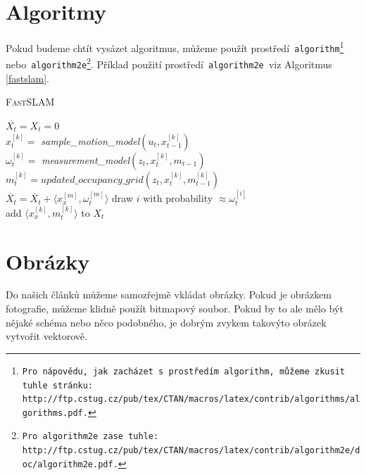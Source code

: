 \documentclass[a4paper,11pt,titlepage]{article}
\begin{document}
\section{Algoritmy} \label{algorithms}
Pokud budeme chtít vysázet algoritmus, můžeme použít prostředí\texttt{ algorithm\footnote{Pro nápovědu, jak zacházet s prostředím\texttt{ algorithm,} můžeme zkusit tuhle 
stránku:\\http://ftp.cstug.cz/pub/tex/CTAN/macros/latex/contrib/algorithms/algorithms.pdf.} } 
nebo\texttt{ algorithm2e\footnote{Pro\texttt{ algorithm2e }zase tuhle: http://ftp.cstug.cz/pub/tex/CTAN/macros/latex/contrib/algorithm2e/doc/algorithm2e.pdf.}}.
Příklad použití prostředí\texttt{ algorithm2e }viz Algoritmus \ref{fastslam}.\\

\bigskip


\begin{algorithm}[H]
\caption{\textsc{FastSLAM}}
\label{fastslam}
\SetNlSty{}{}{:}
\SetInd{1em}{1em}
\SetNlSkip{-1.33em}

\BlankLine
\Indp\Indp
    \ShowLn$\overline{X_t} = X_t = 0$\\
    { 
        $x_t^{[k]} =$ \emph{sample\_motion\_model}$(u_t,x_{t-1}^{[k]})$\\
        $\omega_t^{[k]} =$ \emph{measurement\_model}$(z_t,x_t^{[k]},m_{t-1})$\\
        $m_t^{[k]} = updated\_occupancy\_grid(z_t,x_t^{[k]},m_{t-1}^{[k]})$\\
        $\overline{X_t} = \overline{X_t} + \langle x_x^{[m]},\omega_t^{[m]}\rangle$
    }
    {
        draw $i$ with probability $\approx \omega_t^{[i]}$\\
        add $\langle x_x^{[k]},m_t^{[k]}\rangle$ to $X_t$\\
    }
\end{algorithm}

\medskip


\section{Obrázky}
Do našich článků můžeme samozřejmě vkládat obrázky. Pokud je obrázkem fotografie, můžeme klidně použít bitmapový soubor. Pokud by to ale mělo být nějaké schéma nebo něco podobného, je dobrým zvykem takovýto obrázek vytvořit vektorově.
\end{document}
